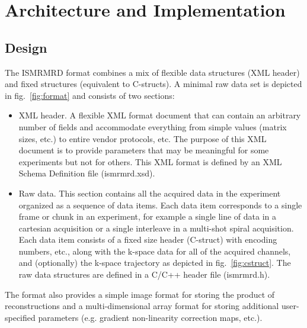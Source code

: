 \documentclass[12pt]{article}
\begin{document}
\section*{Architecture and Implementation}
\subsection*{Design}
The ISMRMRD format combines a mix of flexible data structures (XML header) and fixed structures (equivalent to C-structs).  A minimal raw data set is depicted in fig.~\ref{fig:format} and consists of two sections:
\begin{itemize}
\item{XML header.} A flexible XML format document that can contain an arbitrary number of fields and accommodate everything from simple values (matrix sizes, etc.) to entire vendor protocols, etc. The purpose of this XML document is to provide parameters that may be meaningful for some experiments but not for others. This XML format is defined by an XML Schema Definition file (ismrmrd.xsd).
\item{Raw data.} This section contains all the acquired data in the experiment organized as a sequence of data items.  Each data item corresponds to a single frame or chunk in an experiment, for example a single line of data in a cartesian acquisition or a single interleave in a multi-shot spiral acquisition. Each data item consists of a fixed size header (C-struct) with encoding numbers, etc., along with the k-space data for all of the acquired channels, and (optionally) the k-space trajectory as depicted in fig.~\ref{fig:cstruct}. The raw data structures are defined in a C/C++ header file (ismrmrd.h).
\end{itemize}
The format also provides a simple image format for storing the product of reconstructions and a multi-dimensional array format for storing additional user-specified parameters (e.g. gradient non-linearity correction maps, etc.).
\end{document}

